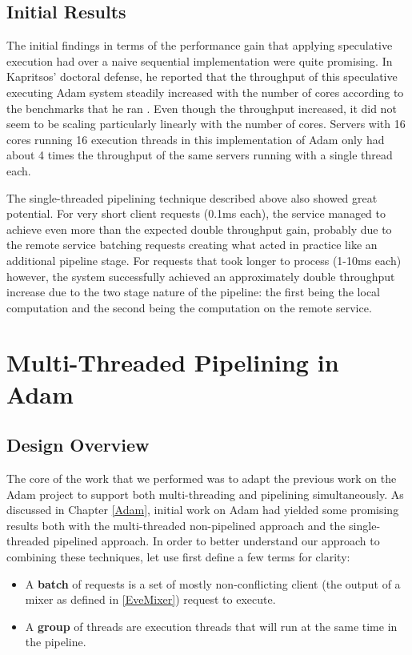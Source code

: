 \documentclass[11pt, oneside]{report}
\begin{document}
\section{Initial Results}

The initial findings in terms of the performance gain that applying speculative execution had over a naive sequential implementation were quite promising. 
In Kapritsos' doctoral defense, he reported that the throughput of this speculative executing Adam system steadily increased with the number of cores according to the benchmarks that he ran \cite{manosThesis}. 
Even though the throughput increased, it did not seem to be scaling particularly linearly with the number of cores. 
Servers with 16 cores running 16 execution threads in this implementation of Adam only had about 4 times the throughput of the same servers running with a single thread each.

The single-threaded pipelining technique described above also showed great potential. 
For very short client requests (0.1ms each), the service managed to achieve even more than the expected double throughput gain, probably due to the remote service batching requests creating what acted in practice like an additional pipeline stage. 
For requests that took longer to process (1-10ms each) however, the system successfully achieved an approximately double throughput increase due to the two stage nature of the pipeline: the first being the local computation and the second being the computation on the remote service.

\chapter{Multi-Threaded Pipelining in Adam}\label{AdamDesign}

\section{Design Overview}

The core of the work that we performed was to adapt the previous work on the Adam project to support both multi-threading and pipelining simultaneously.
As discussed in Chapter \ref{Adam}, initial work on Adam had yielded some promising results both with the multi-threaded non-pipelined approach and the single-threaded pipelined approach. 
In order to better understand our approach to combining these techniques, let use first define a few terms for clarity:
\begin{itemize}
\item A \textbf{batch} of requests is a set of mostly non-conflicting client (the output of a mixer as defined in \ref{EveMixer}) request to execute.
\item A \textbf{group} of threads are execution threads that will run at the same time in the pipeline.
\end{itemize}
\end{document}
